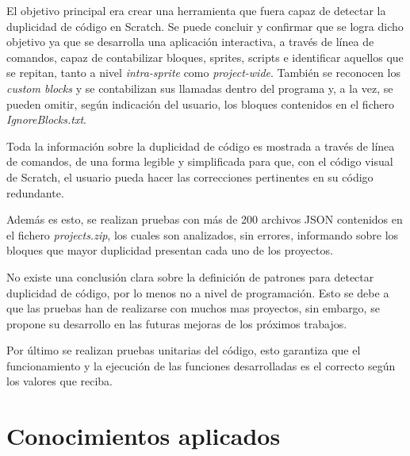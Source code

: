 \documentclass[a4paper, 12pt]{book}
\begin{document}


El objetivo principal era crear una herramienta que fuera capaz de detectar la duplicidad de código en Scratch. Se puede concluir y confirmar que se logra dicho objetivo ya que se desarrolla una aplicación interactiva, a través de línea de comandos, capaz de contabilizar bloques, sprites, scripts e identificar aquellos que se repitan, tanto a nivel \textit{intra-sprite} como \textit{project-wide}. También se reconocen los \textit{custom blocks} y se contabilizan sus llamadas dentro del programa y, a la vez, se pueden omitir, según indicación del usuario, los bloques contenidos en el fichero \textit{IgnoreBlocks.txt}.

Toda la información sobre la duplicidad de código es mostrada a través de línea de comandos, de una forma legible y simplificada para que, con el código visual de Scratch, el usuario pueda hacer las correcciones pertinentes en su código redundante. 

Además es esto, se realizan pruebas con más de 200 archivos JSON contenidos en el fichero \textit{projects.zip}, los cuales son analizados, sin errores, informando sobre los bloques que mayor duplicidad presentan cada uno de los proyectos.

No existe una conclusión clara sobre la definición de patrones para detectar duplicidad de código, por lo menos no a nivel de programación. Esto se debe a que las pruebas han de realizarse con muchos mas proyectos, sin embargo, se propone su desarrollo en las futuras mejoras de los próximos trabajos.

Por último se realizan pruebas unitarias del código, esto garantiza que el funcionamiento y la ejecución de las funciones desarrolladas es el correcto según los valores que reciba.

\section{Conocimientos aplicados}
\label{sec:aplicacion}

\end{document}
